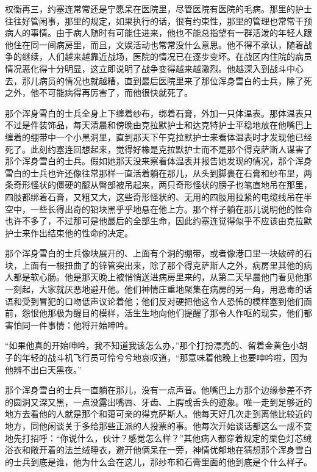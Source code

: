     权衡再三，约塞连常常还是宁愿呆在医院里，尽管医院有医院的毛病。那里的护士往往好管闲事，那里的规定，如果执行的话，很有约束性，那里的管理也常常干预病人的事情。由于病人随时有可能住进来，他也不能总指望有一群活泼的年轻人跟他住在同一间病房里，而且，文娱活动也常常没什么意思。他不得不承认，随着战争的继续，人们越来越靠近战场，医院的情况已在逐步变坏。在战区内住院的病员情况恶化得十分明显，这立即说明了战争变得越来越激烈。他越深入到战斗中心去，那儿病员的情况也就越糟，直到最后医院里来了那位浑身雪白的士兵，除了死之外，他不可能病得再厉害了，而他很快就死了。

 


    那个浑身雪白的士兵全身上下缠着纱布，绑着石膏，外加一只体温表。那体温表只不过是件装饰品，每天清晨和傍晚由克拉默护士和达克特护士平稳地放在他嘴巴上缠着的绷带中一个小黑洞里，直到那天下午克拉默护士来看体温表时才发现他已经死了。此刻约塞连回想起来，觉得好橡是克拉默护士而不是那个得克萨斯人谋害了那个浑身雪白的士兵。假如她那天没来察看体温表并报告她发现的情况，那个浑身雪白的士兵也许还像往常那样一直活着躺在那儿，从头到脚裹在石膏和纱布里，两条奇形怪状的僵硬的腿从臀部被吊起来，两只奇形怪状的膀子也笔直地吊在那里，四肢都绑着石膏，又粗又大，这些奇形怪状的、无用的四肢用拉紧的电缆线吊在半空中，一些长得出奇的铅块黑乎乎地悬在他上方。那个样子躺在那儿说明他的性命也许不多了，不过那可是他最后的全部生命，因此约塞连觉得似乎不应该由克拉默护士来作出结束他的性命的决定。

    那个浑身雪白的士兵像块展开的、上面有个洞的绷带，或者像港口里一块破碎的石块，上面有一根扭曲了的锌管突出来，除了那个得克萨斯人之外，病房里其他的病人都是软心肠。他是那天晚上被悄悄送进病房里来的，从第二天早晨他门看见他那一刻起，大家就厌恶地避开他。他们神情庄重地聚集在病房的另一角，用恶毒的话语和受到冒犯的口吻低声议论着他；他们反对硬把他这令人恐怖的模样塞到他们面前，怨恨他那极为醒目的模样，活生生地向他们提醒了那令人作呕的现实，他们都害怕同一件事情：他将开始呻吟。

    “如果他真的开始呻吟，我不知道我该怎么办，”那个打扮漂亮的、留着金黄色小胡子的年轻的战斗机飞行员可怜兮兮地哀叹道，“那意味着他晚上也要呻吟啦，因为他辨不出白天黑夜。”

 


    那个浑身雪白的士兵一直躺在那儿，没有一点声音。他嘴巴上方那个边缘参差不齐的圆洞又深又黑，一点没露出嘴唇、牙齿、上腭或舌头的迹象。唯一走到足够近的地方去看他的人就是那个和蔼可亲的得克萨斯人。他每天好几次走到离他比较近的地方，同他闲谈关于多给那些正派的人投票的事。他每次开始谈话都这么一成不变地先打招呼：“你说什么，伙计？感觉怎么样？”其他病人都穿着规定的栗色灯芯绒浴衣和敞开着的法兰绒睡衣，避开他俩呆在一旁，神情优郁地在猜想那个浑身雪白的士兵到底是谁，他为什么会在这儿，那纱布和石膏里面的他到底是个什么样子。

